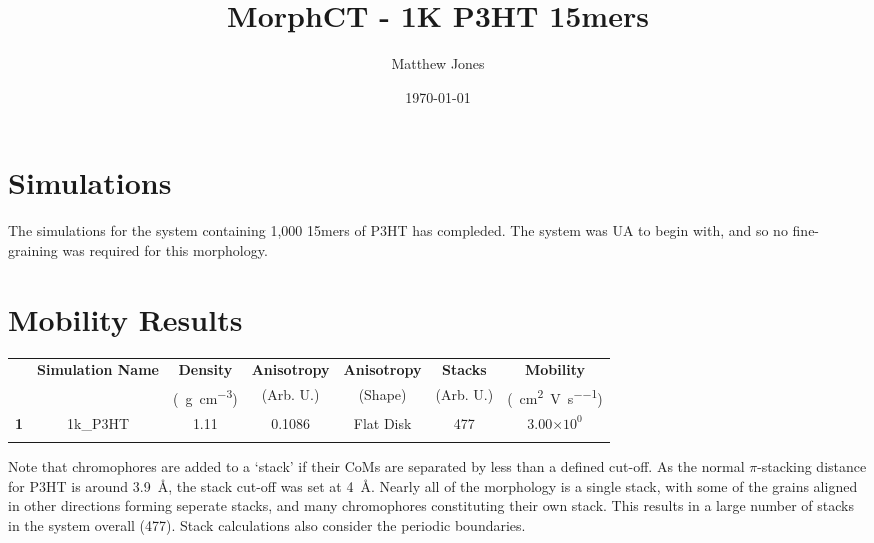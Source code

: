\documentclass[12pt]{article}
\title{MorphCT - 1K P3HT 15mers}
\author{Matthew Jones}
\date{\today}
\def\mobunits{\square\centi\meter\per\volt\per\second}
\def\gcm{\gram\per\cubic\centi\meter}
\def\ccg{\cellcolor{gray}}
\begin{document}
\maketitle


\section{Simulations}


The simulations for the system containing 1,000 15mers of P3HT has compleded.
The system was UA to begin with, and so no fine-graining was required for this morphology.


\section{Mobility Results}


\begin{center}
\begin{tabular}{| c | c | c | c | c | c | c |}
\hline
\rule{0pt}{2.5ex} 
\multirow{2}{*}{\textbf{ID}}&\multirow{2}{*}{\textbf{Simulation Name}}&\textbf{Density}&\textbf{Anisotropy}&\textbf{Anisotropy}&\textbf{Stacks}&\textbf{Mobility}\\
                            &&(\SI{}{\gcm})&(Arb. U.)&(Shape)&(Arb. U.)&(\SI{}{\mobunits})\\
\hhline{|=======|}
\textbf{\ccg1}&\rule{0pt}{2.5ex}\ccg 1k\_P3HT&\ccg 1.11&\ccg 0.1086&\ccg Flat Disk&\ccg477&\ccg3.00$\times 10^{0}$\\
\hhline{-------}
\end{tabular}\label{table:mob}
\end{center}


Note that chromophores are added to a `stack' if their CoMs are separated by less than a defined cut-off.
As the normal $\pi$-stacking distance for P3HT is around 3.9~\AA, the stack cut-off was set at 4~\AA.
Nearly all of the morphology is a single stack, with some of the grains aligned in other directions forming seperate stacks, and many chromophores constituting their own stack.
This results in a large number of stacks in the system overall (477).
Stack calculations also consider the periodic boundaries.


\clearpage
\end{document}
